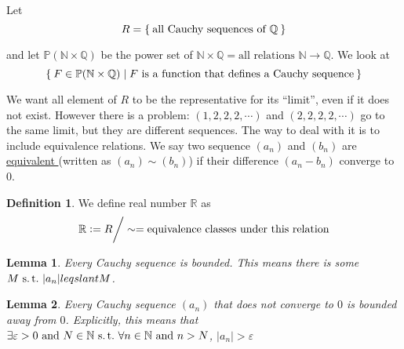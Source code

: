 \documentclass[12pt]{amsart}
\newcommand{\bbR}{\mathbb{R}}
\newcommand{\bbN}{\mathbb{N}}
\newcommand{\bbQ}{\mathbb{Q}}
\newcommand{\bbP}{\mathbb{P}}
\newcommand{\suchthat}{\operatorname{\thinspace s.t. \thinspace}}
\theoremstyle{plain}
\newtheorem*{lem}{Lemma}
\theoremstyle{remark}
\theoremstyle{definition}
\newtheorem*{define}{Definition}
\begin{document}
\par
Let 
\begin{equation*}
	R = \Set{\mbox{all Cauchy sequences of } \bbQ}
\end{equation*}

and let $\bbP(\bbN \times \bbQ)$ be the power set of $\bbN \times \bbQ = \mbox{all relations } \bbN \rightarrow \bbQ$. We look at 
\begin{equation*}
	\Set{F \in \bbP(\bbN \times \bbQ) | F \mbox{ is a function that defines a Cauchy sequence}}
\end{equation*}

We want all element of $R$ to be the representative for its ``limit'', even if it does not exist. However there is a problem:
\newline
$(1,2,2,2,\cdots)$ and $(2,2,2,2,\cdots)$ go to the same limit, but they are different sequences. The way to deal with it is to include equivalence relations. We say two sequence $(a_n)$ and $(b_n)$ are \ul{equivalent } (written as $(a_n) \sim (b_n)$) if their difference $(a_n - b_n)$ converge to $0$. 

\begin{define}
	We define real number $\bbR$ as
	\begin{equation*}
		\bbR \vcentcolon = R \bigg/\sim = \mbox{equivalence classes under this relation}
	\end{equation*}
\end{define}

\begin{lem}
	Every Cauchy sequence is bounded. This means there is some $M \suchthat |a_n| leqslant M$.  
\end{lem}
\begin{lem} Every Cauchy sequence $(a_n)$ that does not converge to $0$ is bounded away from $0$. Explicitly, this means that $\exists \varepsilon > 0 \mbox{ and } N \in \bbN \suchthat \forall n \in \bbN \mbox{ and } n > N$, $|a_n| > \varepsilon$  
\end{lem}
\end{document}

